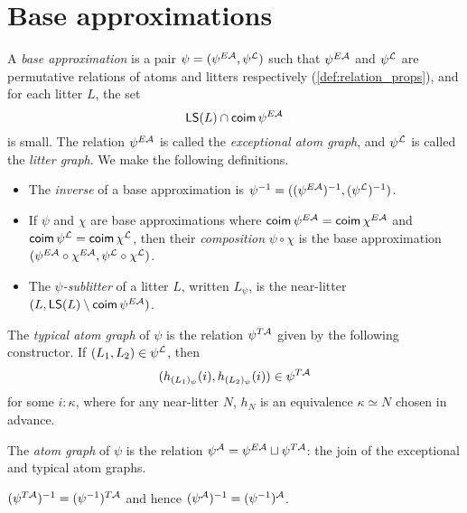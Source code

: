 \section{Base approximations}
\begin{definition}
  \label{def:BaseApprox}
  \leanok
  A \emph{base approximation} is a pair \( \psi = (\psi^{E{\mathcal A}}, \psi^{\mathcal L}) \) such that \( \psi^{E{\mathcal A}} \) and \( \psi^{\mathcal L} \) are permutative relations of atoms and litters respectively (\cref{def:relation_props}), and for each litter \( L \), the set
  \[ \operatorname{\mathsf{LS}}(L) \cap \operatorname{\mathsf{coim}} \psi^{E{\mathcal A}} \]
  is small.
  The relation \( \psi^{E{\mathcal A}} \) is called the \emph{exceptional atom graph}, and \( \psi^{\mathcal L} \) is called the \emph{litter graph}.
  We make the following definitions.
  \begin{itemize}
    \item The \emph{inverse} of a base approximation is \( \psi^{-1} = ((\psi^{E{\mathcal A}})^{-1}, (\psi^{\mathcal L})^{-1}) \).
    \item If \( \psi \) and \( \chi \) are base approximations where \( \operatorname{\mathsf{coim}} \psi^{E{\mathcal A}} = \operatorname{\mathsf{coim}} \chi^{E{\mathcal A}} \) and \( \operatorname{\mathsf{coim}} \psi^{\mathcal L} = \operatorname{\mathsf{coim}} \chi^{\mathcal L} \), then their \emph{composition} \( \psi \circ \chi \) is the base approximation \( (\psi^{E{\mathcal A}} \circ \chi^{E{\mathcal A}}, \psi^{\mathcal L} \circ \chi^{\mathcal L}) \).
    \item The \emph{\( \psi \)-sublitter} of a litter \( L \), written \( L_\psi \), is the near-litter \( (L, \operatorname{\mathsf{LS}}(L) \setminus \operatorname{\mathsf{coim}} \psi^{E{\mathcal A}}) \).
  \end{itemize}
\end{definition}
\begin{definition}
  \label{def:atomGraph}
  \leanok
  The \emph{typical atom graph} of \( \psi \) is the relation \( \psi^{T{\mathcal A}} \) given by the following constructor.
  If \( (L_1, L_2) \in \psi^{\mathcal L} \), then
  \[ (h_{(L_1)_\psi}(i), h_{(L_2)_\psi}(i)) \in \psi^{T{\mathcal A}} \]
  for some \( i : \kappa \), where for any near-litter \( N \), \( h_N \) is an equivalence \( \kappa \simeq N \) chosen in advance.

  The \emph{atom graph} of \( \psi \) is the relation \( \psi^{\mathcal A} = \psi^{E{\mathcal A}} \sqcup \psi^{T{\mathcal A}} \): the join of the exceptional and typical atom graphs.
\end{definition}
\begin{proposition}
  \label{prop:atomGraph_inv}
  \leanok
  \( (\psi^{T{\mathcal A}})^{-1} = (\psi^{-1})^{T{\mathcal A}} \) and hence \( (\psi^{\mathcal A})^{-1} = (\psi^{-1})^{\mathcal A} \).
\end{proposition}
